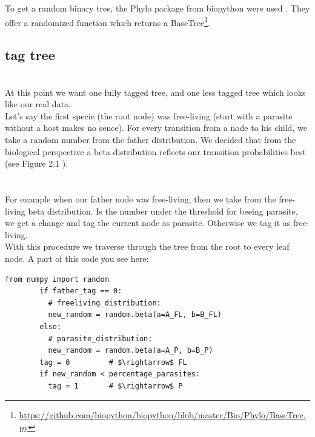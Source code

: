       To get a random binary tree, the Phylo package from biopython were used \cite{Cock2009}. They offer 
        a randomized function which returns a BaseTree\footnote{
          \hyperlink{https://github.com/biopython/biopython/blob/master/Bio/Phylo/BaseTree.py}
          {https://github.com/biopython/biopython/blob/master/Bio/Phylo/BaseTree.py}
        }. \\

    \subsection{tag tree}
       \\
      At this point we want one fully tagged tree, and one less tagged tree which looks like our real 
        data.\\
      Let's say the first specie (the root node) was free-living (start with a parasite without a host 
        makes no sence). For every transition from a node to his child, we take a random number from
        the father distribution. We decided that from the biological perspective a beta distribution
        reflects our transition probabilities best (see Figure 2.1 ). \\
       \\
       \\
      For example when our father node was free-living, then we take from the free-living beta
        distribution. Is the number under the threshold for beeing parasite, we get a change and tag
        the current node as parasite. Otherwise we tag it as free-living. \\
      With this procedure we traverse through the tree from the root to every leaf node. A part of
        this code you see here:
      \begin{lstlisting}[gobble=6]
        from numpy import random
        if father_tag == 0:
          # freeliving_distribution:
          new_random = random.beta(a=A_FL, b=B_FL)
        else:
          # parasite_distribution:
          new_random = random.beta(a=A_P, b=B_P)
        tag = 0         # $\rightarrow$ FL
        if new_random < percentage_parasites:
          tag = 1       # $\rightarrow$ P
      \end{lstlisting}
